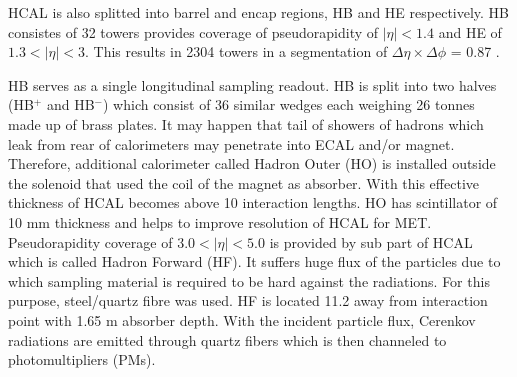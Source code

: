 \par HCAL is also splitted into barrel and encap regions, HB and HE respectively. HB consistes of 32 towers provides coverage of pseudorapidity of $|\eta|<1.4 $ and HE of $1.3 < |\eta| < 3$. This results in 2304 towers in a segmentation of $\Delta \eta \times \Delta \phi $ = 0.87 . 

HB serves as a single longitudinal sampling readout. 
HB is split into two halves (HB${}^{+}$ and HB${}^{-}$) which consist of 36 similar wedges each weighing 26 tonnes made up of brass plates. %
It may happen that tail of showers of hadrons which leak from rear of calorimeters may penetrate into ECAL and/or magnet. Therefore, additional calorimeter called Hadron Outer (HO) is installed outside the solenoid that used the coil of the magnet as absorber. With this effective thickness of HCAL becomes above 10 interaction lengths. HO has scintillator of 10 mm thickness and helps to improve resolution of HCAL for MET.\\
Pseudorapidity coverage of $3.0<|\eta|<5.0$ is provided by sub part of HCAL which is called Hadron Forward (HF). It suffers huge flux of the particles due to which sampling material is required to be hard against the radiations. For this purpose, steel/quartz fibre was used. HF is located 11.2 away from interaction point with 1.65 m absorber depth. With the incident particle flux, Cerenkov radiations are emitted through quartz fibers which is then channeled to photomultipliers (PMs).

